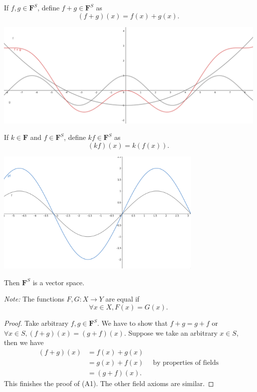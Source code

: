 \documentclass[11pt]{article}
\begin{document}
\begin{enumerate}
        If \(f,g \in \textbf{F}^{S}\), define \(f + g \in \textbf{F}^{S} \) as \[(f+g)(x) = f(x) + g(x).\]
        \begin{center}
            \includegraphics[width=\textwidth]{fg.png}
        \end{center}
        If \(k \in \textbf{F}\) and \(f \in \textbf{F}^{S}\), define \(kf \in \textbf{F}^{S}\) as \[(kf)(x) = k(f(x)).\]
        \begin{center}
            \includegraphics[width=10cm]{2f.png}
        \end{center}
        Then \(\textbf{F}^{S}\) is a vector space.

        \vspace{1em}

        \emph{Note:} The functions \(F,G : X \rightarrow Y\) are equal if \[\forall x \in X, F(x) = G(x).\]

        \begin{proof}
            Take arbitrary \(f,g \in \textbf{F}^{S}\). We have to show that \(f + g = g + f\) or \(\forall x \in S, (f + g)(x) = (g + f)(x).\) Suppose we take an arbitrary \(x \in S\), then we have
            \begin{align*}
                (f+g)(x) &= f(x) + g(x)                                       \\
                         &= g(x) + f(x) \quad \text{ by properties of fields} \\
                         &= (g+f)(x).
            \end{align*}  
            This finishes the proof of (A1). The other field axioms are similar.
        \end{proof}


\end{enumerate}
\end{document}
